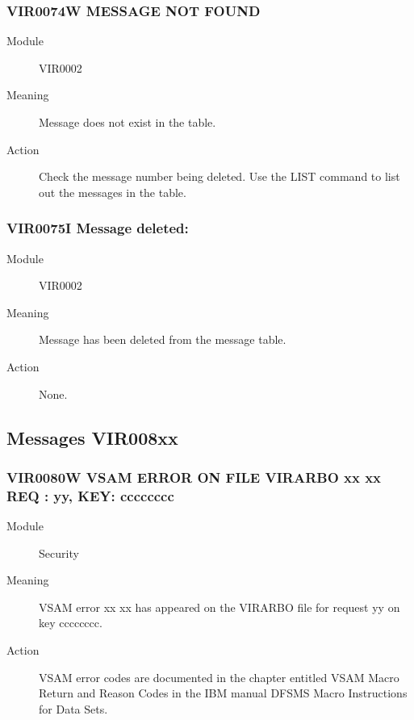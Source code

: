 \documentclass[letterpaper,10pt,english]{sphinxmanual}
\begin{document}
\subsubsection{VIR0074W MESSAGE NOT FOUND}
\label{\detokenize{messages:vir0074w-message-not-found}}\begin{description}
\item[{Module}] \leavevmode
VIR0002

\item[{Meaning}] \leavevmode
Message does not exist in the table.

\item[{Action}] \leavevmode
Check the message number being deleted. Use the LIST command to list out the messages in the table.

\end{description}


\subsubsection{VIR0075I Message deleted: }
\label{\detokenize{messages:vir0075i-message-deleted-messageid}}\begin{description}
\item[{Module}] \leavevmode
VIR0002

\item[{Meaning}] \leavevmode
Message  has been deleted from the message table.

\item[{Action}] \leavevmode
None.

\end{description}


\subsection{Messages VIR008xx}
\label{\detokenize{messages:messages-vir008xx}}

\subsubsection{VIR0080W VSAM ERROR ON FILE VIRARBO xx xx REQ : yy, KEY: cccccccc}
\label{\detokenize{messages:vir0080w-vsam-error-on-file-virarbo-xx-xx-req-yy-key-cccccccc}}\begin{description}
\item[{Module}] \leavevmode
Security

\item[{Meaning}] \leavevmode
VSAM error xx xx has appeared on the VIRARBO file for request yy on key cccccccc.

\item[{Action}] \leavevmode
VSAM error codes are documented in the chapter entitled VSAM Macro Return and Reason Codes in the IBM manual DFSMS Macro Instructions for Data Sets.

\end{description}
\end{document}
